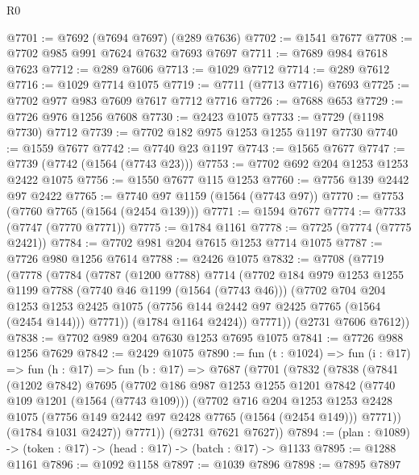 \begin{lexlean}{R0}
\begin{coremodule}
@7701 := @7692 (@7694 @7697) (@289 @7636)
@7702 := @1541 @7677
@7708 := @7702 @985 @991 @7624 @7632 @7693 @7697
@7711 := @7689 @984 @7618 @7623
@7712 := @289 @7606
@7713 := @1029 @7712
@7714 := @289 @7612
@7716 := @1029 @7714 @1075
@7719 := @7711 (@7713 @7716) @7693
@7725 := @7702 @977 @983 @7609 @7617 @7712 @7716
@7726 := @7688 @653
@7729 := @7726 @976 @1256 @7608
@7730 := @2423 @1075
@7733 := @7729 (@1198 @7730) @7712
@7739 := @7702 @182 @975 @1253 @1255 @1197 @7730
@7740 := @1559 @7677
@7742 := @7740 @23 @1197
@7743 := @1565 @7677
@7747 := @7739 (@7742 (@1564 (@7743 @23)))
@7753 := @7702 @692 @204 @1253 @1253 @2422 @1075
@7756 := @1550 @7677 @115 @1253
@7760 := @7756 @139 @2442 @97 @2422
@7765 := @7740 @97 @1159 (@1564 (@7743 @97))
@7770 := @7753 (@7760 @7765 (@1564 (@2454 @139)))
@7771 := @1594 @7677
@7774 := @7733 (@7747 (@7770 @7771))
@7775 := @1784 @1161
@7778 := @7725 (@7774 (@7775 @2421))
@7784 := @7702 @981 @204 @7615 @1253 @7714 @1075
@7787 := @7726 @980 @1256 @7614
@7788 := @2426 @1075
@7832 := @7708
    (@7719
      (@7778
        (@7784
          (@7787
            (@1200 @7788)
            @7714
            (@7702
              @184
              @979
              @1253
              @1255
              @1199
              @7788
              (@7740 @46 @1199 (@1564 (@7743 @46)))
              (@7702
                @704
                @204
                @1253
                @1253
                @2425
                @1075
                (@7756 @144 @2442 @97 @2425 @7765 (@1564 (@2454 @144)))
                @7771))
            (@1784 @1164 @2424))
          @7771))
      (@2731 @7606 @7612))
@7838 := @7702 @989 @204 @7630 @1253 @7695 @1075
@7841 := @7726 @988 @1256 @7629
@7842 := @2429 @1075
@7890 := fun (t : @1024) =>
  fun (i : @17) =>
  fun (h : @17) =>
  fun (b : @17) =>
  @7687
    (@7701
      (@7832
        (@7838
          (@7841
            (@1202 @7842)
            @7695
            (@7702
              @186
              @987
              @1253
              @1255
              @1201
              @7842
              (@7740 @109 @1201 (@1564 (@7743 @109)))
              (@7702
                @716
                @204
                @1253
                @1253
                @2428
                @1075
                (@7756 @149 @2442 @97 @2428 @7765 (@1564 (@2454 @149)))
                @7771))
            (@1784 @1031 @2427))
          @7771))
      (@2731 @7621 @7627))
@7894 := (plan : @1089) -> (token : @17) -> (head : @17) -> (batch : @17) -> @1133
@7895 := @1288 @1161
@7896 := @1092 @1158
@7897 := @1039 @7896
@7898 := @7895 @7897

\end{coremodule}
\end{lexlean}
